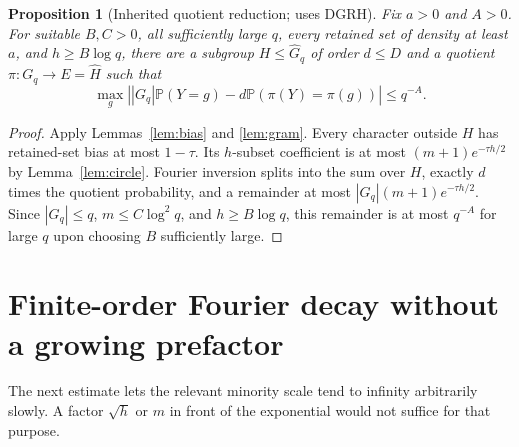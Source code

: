 \documentclass[11pt]{article}
\newtheorem{proposition}[theorem]{Proposition}
\theoremstyle{remark}\newtheorem{remark}[theorem]{Remark}
\newcommand{\Pp}{\mathbb P}
\newcommand{\abs}[1]{\left|#1\right|}
\begin{document}
\begin{proposition}[Inherited quotient reduction; uses DGRH]\label{prop:quotient}
Fix $a>0$ and $A>0$. For suitable $B,C>0$, all sufficiently large $q$, every retained set of density at least $a$, and $h\ge B\log q$, there are a subgroup $H\le\widehat G_q$ of order $d\le D$ and a quotient $\pi:G_q\to E=\widehat H$ such that
\begin{equation}\label{eq:reduction}
 \max_g\abs{|G_q|\Pp(Y=g)-d\Pp(\pi(Y)=\pi(g))}\le q^{-A}.
\end{equation}
\end{proposition}
\begin{proof}
Apply Lemmas~\ref{lem:bias} and \ref{lem:gram}. Every character outside $H$ has retained-set bias at most $1-\tau$. Its $h$-subset coefficient is at most $(m+1)e^{-\tau h/2}$ by Lemma~\ref{lem:circle}. Fourier inversion splits into the sum over $H$, exactly $d$ times the quotient probability, and a remainder at most $|G_q|(m+1)e^{-\tau h/2}$. Since $|G_q|\le q$, $m\le C\log^2q$, and $h\ge B\log q$, this remainder is at most $q^{-A}$ for large $q$ upon choosing $B$ sufficiently large.
\end{proof}

\section{Finite-order Fourier decay without a growing prefactor}\label{sec:decay}

The next estimate lets the relevant minority scale tend to infinity arbitrarily slowly. A factor $\sqrt h$ or $m$ in front of the exponential would not suffice for that purpose.
\end{document}
